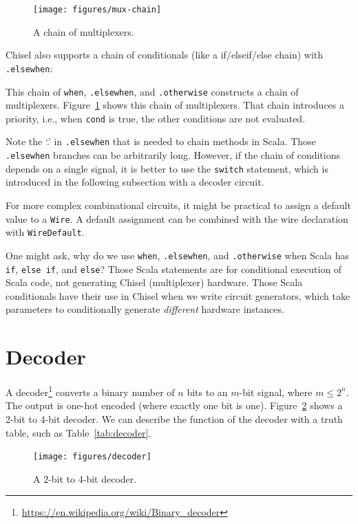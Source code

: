 \documentclass[%
    10pt,
    headinclude, footexclude,
    openright, %
    notitlepage,
    cleardoubleempty,
    headsepline,
    pointlessnumbers,
    bibtotoc, idxtotoc,
    ]{scrbook}
\newcommand{\code}[1]{{\lstinline[basicstyle=\small\ttfamily]{#1}}}
\newcommand{\myref}[2]{\href{#1}{#2}}
\renewcommand{\myref}[2]{{#2}{\footnote{\url{#1}}}}
\begin{document}
\begin{figure}
  \centering
  \texttt{[image: figures/mux-chain]}
  \caption{A chain of multiplexers.}
  \label{fig:mux-chain}
\end{figure}

Chisel also supports a chain of conditionals (like a if/elseif/else chain) with \code{.elsewhen}:


\noindent This chain of \code{when}, \code{.elsewhen}, and \code{.otherwise}
constructs a chain of multiplexers. Figure~\ref{fig:mux-chain} shows this chain of multiplexers.
That chain introduces a priority, i.e., when \code{cond} is true, the other conditions
are not evaluated.

Note the `.' in \code{.elsewhen} that is needed to chain methods in Scala.
Those \code{.elsewhen} branches can be arbitrarily long.
However, if the chain of conditions depends on a single signal, it is better
to use the \code{switch} statement, which is introduced in the following
subsection with a decoder circuit.

For more complex combinational circuits, it might be practical to assign
a default value to a \code{Wire}. A default assignment can be combined with the wire
declaration with \code{WireDefault}.


One might ask, why do we use \code{when}, \code{.elsewhen}, and \code{.otherwise}
when Scala has \code{if}, \code{else if}, and \code{else}? Those Scala statements are for
conditional execution of Scala code, not generating Chisel (multiplexer) hardware.
Those Scala conditionals have their use in Chisel when we write circuit generators,
which take parameters to conditionally generate \emph{different} hardware instances.

\section{Decoder}

A \myref{https://en.wikipedia.org/wiki/Binary_decoder}{decoder}
converts a binary number of $n$ bits to an $m$-bit signal, where $m \leq 2^n$.
The output is one-hot encoded (where exactly one bit is one).
Figure~\ref{fig:decoder} shows a 2-bit to 4-bit decoder. We can describe the function
of the decoder with a truth table, such as Table~\ref{tab:decoder}.

\begin{figure}
  \centering
  \texttt{[image: figures/decoder]}
  \caption{A 2-bit to 4-bit decoder.}
  \label{fig:decoder}
\end{figure}
\end{document}
